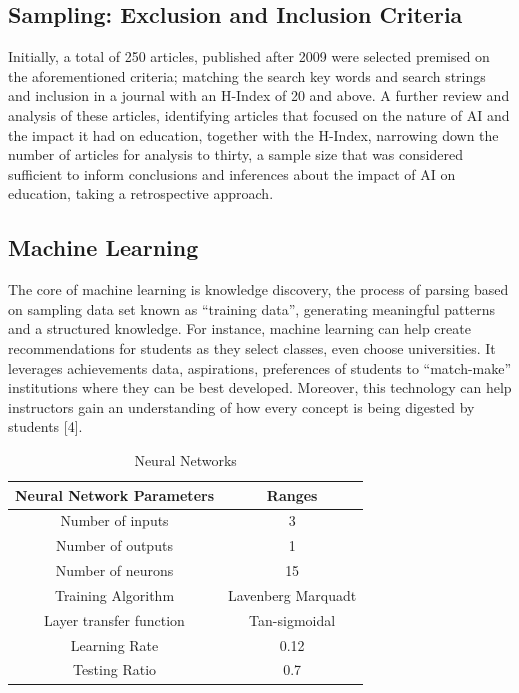 \documentclass[conference]{IEEEtran}
\begin{document}
\subsection{Sampling: Exclusion and Inclusion Criteria}
Initially, a total of 250 articles, published after 2009 were selected premised on the aforementioned criteria; matching the search key words and search strings and inclusion in a journal with an H-Index of 20 and above. A further review and analysis of these articles, identifying articles that focused on the nature of AI and the impact it had on education, together with the H-Index, narrowing down the number of articles for analysis to thirty, a sample size that was considered sufficient to inform conclusions and inferences about the impact of AI on education, taking a retrospective approach. 

\subsection{Machine Learning}

The core of machine learning is knowledge discovery, the process of parsing based on sampling data set known as “training data”, generating meaningful patterns and a structured knowledge. For instance, machine learning can help create recommendations for students as they select classes, even choose universities. It leverages achievements data, aspirations, preferences of students to “match-make” institutions where they can be best developed. Moreover, this technology can help instructors gain an understanding of how every concept is being digested by students [4]. \\
\vspace{-6mm}
\begin{table}[h]
\begin{center}
\caption{Neural Networks}
\begin{tabular}{|c|c|}
\hline
\textbf{Neural Network Parameters} & \textbf{Ranges} \\ \hline
Number of inputs  & 3 \\ \hline
Number of outputs & 1 \\ \hline
Number of neurons & 15\\ \hline
Training Algorithm & Lavenberg Marquadt\\ \hline
Layer transfer function & Tan-sigmoidal \\ \hline
Learning Rate & 0.12\\ \hline
Testing Ratio & 0.7\\ \hline
\end{tabular}
\end{center}
\end{table}
\end{document}
